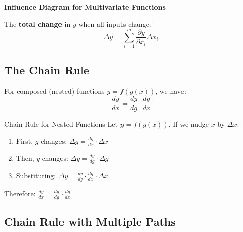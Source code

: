 \begin{boxed}
\textbf{Influence Diagram for Multivariate Functions} \\[1em]
\begin{center}
\end{center}
\end{boxed}

The \textbf{total change} in $y$ when all inputs change:
\[
\Delta y = \sum_{i=1}^{m} \frac{\partial y}{\partial x_i} \Delta x_i
\]

\subsection{The Chain Rule}

For composed (nested) functions $y = f(g(x))$, we have:
\[
\frac{dy}{dx} = \frac{dy}{dg} \cdot \frac{dg}{dx}
\]

\begin{derivation}{Chain Rule for Nested Functions}
Let $y = f(g(x))$. If we nudge $x$ by $\Delta x$:
\begin{enumerate}
    \item First, $g$ changes: $\Delta g = \frac{dg}{dx} \cdot \Delta x$
    \item Then, $y$ changes: $\Delta y = \frac{dy}{dg} \cdot \Delta g$
    \item Substituting: $\Delta y = \frac{dy}{dg} \cdot \frac{dg}{dx} \cdot \Delta x$
\end{enumerate}
Therefore: $\boxed{\frac{dy}{dx} = \frac{dy}{dg} \cdot \frac{dg}{dx}}$
\end{derivation}

\subsection{Chain Rule with Multiple Paths}

